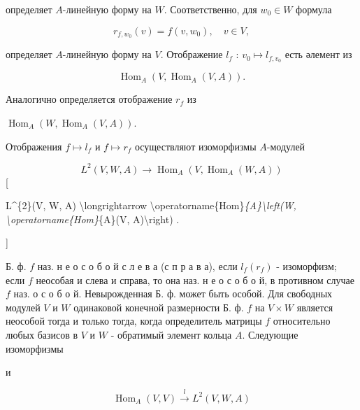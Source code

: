 \documentclass[10pt]{article}
\begin{document}
определяет $A$-линейную форму на $W$. Соответственно, для $w_{0} \in W$ формула



\[

r_{f, w_{0}}(v)=f\left(v, w_{0}\right), \quad v \in V,

\]



определяет $A$-линейную форму на $V$. Отображение $l_{f}$ : $v_{0} \longmapsto l_{f, v_{0}}$ есть әлемент из



\[

\operatorname{Hom}_{A}\left(V, \operatorname{Hom}_{A}(V, A)\right) .

\]



Аналогично определяется отображение $r_{f}$ из



$\operatorname{Hom}_{A}\left(W, \operatorname{Hom}_{A}(V, A)\right)$.



Отображения $f \longmapsto l_{f}$ и $f \longmapsto r_{f}$ осуществляют изоморфизмы $A$-модулей



\[

L^{2}(V, W, A) \rightarrow \operatorname{Hom}_{A}\left(V, \operatorname{Hom}_{A}(W, A)\right)

\][



L\^{}\{2\}(V, W, A) \textbackslash longrightarrow \textbackslash operatorname\{Hom\}\textit{\{A\}\textbackslash left(W, \textbackslash operatorname\{Hom\}}\{A\}(V, A)\textbackslash right) .

]



Б. ф. $f$ наз. н е о с о б о й с л е в а (с п р а в а), если $l_{f}\left(r_{f}\right)$ - изоморфизм; если $f$ неособая и слева и справа, то она наз. н е о с о б о й, в противном случае $f$ наз. о с о б о й. Невырожденная Б. ф. может быть особой. Для свободных модулей $V$ и $W$ одинаковой конечной размерности Б. ф. $f$ на $V \times W$ является неособой тогда и только тогда, когда определитель матрицы $f$ относительно любых базисов в $V$ и $W$ - обратимый элемент кольца $A$. Следующие изоморфизмы



и



\[

\operatorname{Hom}_{A}(V, V) \stackrel{l}{\longrightarrow} L^{2}(V, W, A)

\]
\end{document}
